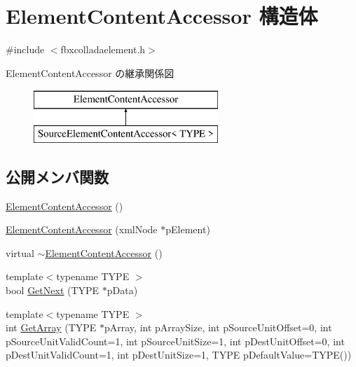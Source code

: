 \hypertarget{struct_element_content_accessor}{}\section{Element\+Content\+Accessor 構造体}
\label{struct_element_content_accessor}


{\ttfamily \#include $<$fbxcolladaelement.\+h$>$}

Element\+Content\+Accessor の継承関係図\begin{figure}[H]
\begin{center}
\leavevmode
\includegraphics[height=2.000000cm]{struct_element_content_accessor}
\end{center}
\end{figure}
\subsection*{公開メンバ関数}
\begin{DoxyCompactItemize}
\item 
\hyperlink{struct_element_content_accessor_a59a1e00643f9f94ff680d2f63f80b0cd}{Element\+Content\+Accessor} ()
\item 
\hyperlink{struct_element_content_accessor_af1a83e6fae2facae0b94d0c7332e0a2e}{Element\+Content\+Accessor} (xml\+Node $\ast$p\+Element)
\item 
virtual \hyperlink{struct_element_content_accessor_a269fa630fb13ff74aa591f53de51a976}{$\sim$\+Element\+Content\+Accessor} ()
\item 
{\footnotesize template$<$typename T\+Y\+PE $>$ }\\bool \hyperlink{struct_element_content_accessor_a5c066a3db4f929723fc1a78c11745154}{Get\+Next} (T\+Y\+PE $\ast$p\+Data)
\item 
{\footnotesize template$<$typename T\+Y\+PE $>$ }\\int \hyperlink{struct_element_content_accessor_a412f6cb46b068e160e393f4318bcf4fc}{Get\+Array} (T\+Y\+PE $\ast$p\+Array, int p\+Array\+Size, int p\+Source\+Unit\+Offset=0, int p\+Source\+Unit\+Valid\+Count=1, int p\+Source\+Unit\+Size=1, int p\+Dest\+Unit\+Offset=0, int p\+Dest\+Unit\+Valid\+Count=1, int p\+Dest\+Unit\+Size=1, T\+Y\+PE p\+Default\+Value=T\+Y\+PE())
\end{DoxyCompactItemize}
